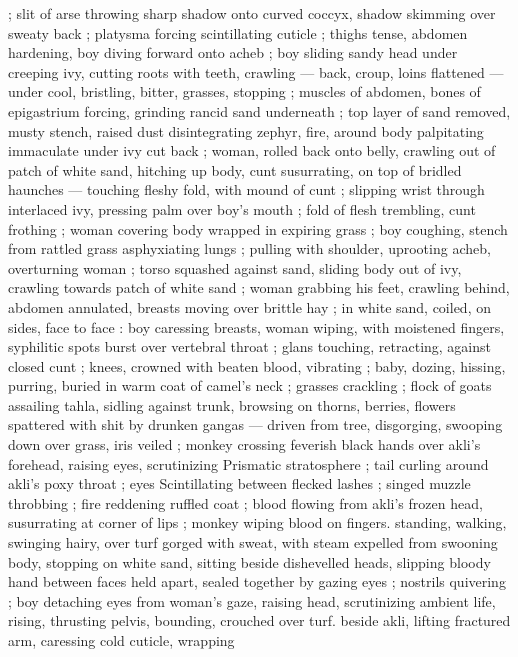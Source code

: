 ; slit of arse throwing sharp shadow onto curved coccyx, shadow 
skimming over sweaty back ; platysma forcing scintillating cuticle ; 
thighs tense, abdomen hardening, boy diving forward onto acheb ; 
boy sliding sandy head under creeping ivy, cutting roots with teeth, 
crawling --- back, croup, loins flattened --- under cool, bristling, 
bitter, grasses, stopping ; muscles of abdomen, bones of 
epigastrium forcing, grinding rancid sand underneath ; top layer of 
sand removed, musty stench, raised dust disintegrating zephyr, fire, 
around body palpitating immaculate under ivy cut back ; woman, 
rolled back onto belly, crawling out of patch of white sand, hitching 
up body, cunt susurrating, on top of bridled haunches --- touching 
fleshy fold, with mound of cunt ; slipping wrist through interlaced ivy, 
pressing palm over boy's mouth ; fold of flesh trembling, cunt 
frothing ; woman covering body wrapped in expiring grass ; boy 
coughing, stench from rattled grass asphyxiating lungs ; pulling with 
shoulder, uprooting acheb, overturning woman ; torso squashed 
against sand, sliding body out of ivy, crawling towards patch of white 
sand ; woman grabbing his feet, crawling behind, abdomen 
annulated, breasts moving over brittle hay ; in white sand, coiled, on 
sides, face to face : boy caressing breasts, woman wiping, with 
moistened fingers, syphilitic spots burst over vertebral throat ; glans 
touching, retracting, against closed cunt ; knees, crowned with 
beaten blood, vibrating ; baby, dozing, hissing, purring, buried in 
warm coat of camel's neck ; grasses crackling ; flock of goats 
assailing tahla, sidling against trunk, browsing on thorns, berries, 
flowers spattered with shit by drunken gangas --- driven from tree, 
disgorging, swooping down over grass, iris veiled ; monkey crossing 
feverish black hands over akli's forehead, raising eyes, scrutinizing 
Prismatic stratosphere ; tail curling around akli's poxy throat ; eyes 
Scintillating between flecked lashes ; singed muzzle throbbing ; fire 
reddening ruffled coat ; blood flowing from akli's frozen head, 
susurrating at corner of lips ; monkey wiping blood on fingers. 
standing, walking, swinging hairy, over turf gorged with sweat, with 
steam expelled from swooning body, stopping on white sand, sitting 
beside dishevelled heads, slipping bloody hand between faces held 
apart, sealed together by gazing eyes ; nostrils quivering ; boy 
detaching eyes from woman's gaze, raising head, scrutinizing 
ambient life, rising, thrusting pelvis, bounding, crouched over turf. 
beside akli, lifting fractured arm, caressing cold cuticle, wrapping 
